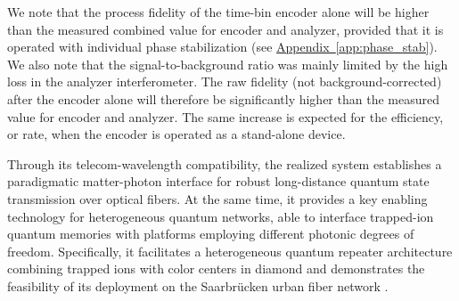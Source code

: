 \documentclass[reprint, superscriptaddress, longbibliography, floatfix, twocolumn, nofootinbib, amsmath, amssymb, aps, showkeys]{revtex4-2}
\newcommand{\JE}[1]{{\textbf{\color{blue}[#1]}}}
\newcommand{\appref}[1]{\hyperref[#1]{Appendix~\ref*{#1}}}
\begin{document}
We note that the process fidelity of the time-bin encoder alone will be higher than the measured combined value for encoder and analyzer, provided that it is operated with individual phase stabilization (see \appref{app:phase_stab}).
We also note that the signal-to-background ratio was mainly limited by the high loss in the analyzer interferometer. The raw fidelity (not background-corrected) after the encoder alone will therefore be significantly higher than the measured value for encoder and analyzer. The same increase is expected for the efficiency, or rate, when the encoder is operated as a stand-alone device. 

Through its telecom-wavelength compatibility, the realized system establishes a paradigmatic matter-photon interface for robust long-distance quantum state transmission over optical fibers. At the same time, it provides a key enabling technology for heterogeneous quantum networks, able to interface trapped-ion quantum memories with platforms employing different photonic degrees of freedom. Specifically, it facilitates a heterogeneous quantum repeater architecture combining trapped ions \cite{Bergerhoff_2026} with color centers in diamond \cite{Stolk_2024, Brevoord_2025, Knaut_2024, Schaefer_2025, Herrmann_2026} and demonstrates the feasibility of its deployment on the Saarbrücken urban fiber network \cite{Kucera_2024}. %

\end{document}
